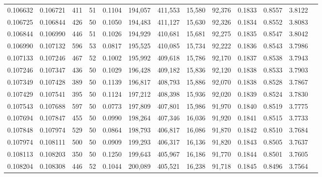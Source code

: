 \begin{tabular}{rrrrrrrrrrrrr}
0.106632 & 0.106721 &   411 &  51 &                                     0.1104 & 194,057 & 411,553 &  15,580 &  92,376 & 0.1833 & 0.8557 & 3.8122 \\
0.106725 & 0.106844 &   426 &  50 &                                     0.1050 & 194,483 & 411,127 &  15,630 &  92,326 & 0.1834 & 0.8552 & 3.8083 \\
0.106844 & 0.106990 &   446 &  51 &                                     0.1026 & 194,929 & 410,681 &  15,681 &  92,275 & 0.1835 & 0.8547 & 3.8042 \\
0.106990 & 0.107132 &   596 &  53 &                                     0.0817 & 195,525 & 410,085 &  15,734 &  92,222 & 0.1836 & 0.8543 & 3.7986 \\
0.107133 & 0.107246 &   467 &  52 &                                     0.1002 & 195,992 & 409,618 &  15,786 &  92,170 & 0.1837 & 0.8538 & 3.7943 \\
0.107246 & 0.107347 &   436 &  50 &                                     0.1029 & 196,428 & 409,182 &  15,836 &  92,120 & 0.1838 & 0.8533 & 3.7903 \\
0.107349 & 0.107428 &   389 &  50 &                                     0.1139 & 196,817 & 408,793 &  15,886 &  92,070 & 0.1838 & 0.8528 & 3.7867 \\
0.107429 & 0.107541 &   395 &  50 &                                     0.1124 & 197,212 & 408,398 &  15,936 &  92,020 & 0.1839 & 0.8524 & 3.7830 \\
0.107543 & 0.107688 &   597 &  50 &                                     0.0773 & 197,809 & 407,801 &  15,986 &  91,970 & 0.1840 & 0.8519 & 3.7775 \\
0.107694 & 0.107847 &   455 &  50 &                                     0.0990 & 198,264 & 407,346 &  16,036 &  91,920 & 0.1841 & 0.8515 & 3.7733 \\
0.107848 & 0.107974 &   529 &  50 &                                     0.0864 & 198,793 & 406,817 &  16,086 &  91,870 & 0.1842 & 0.8510 & 3.7684 \\
0.107974 & 0.108111 &   500 &  50 &                                     0.0909 & 199,293 & 406,317 &  16,136 &  91,820 & 0.1843 & 0.8505 & 3.7637 \\
0.108113 & 0.108203 &   350 &  50 &                                     0.1250 & 199,643 & 405,967 &  16,186 &  91,770 & 0.1844 & 0.8501 & 3.7605 \\
0.108204 & 0.108308 &   446 &  52 &                                     0.1044 & 200,089 & 405,521 &  16,238 &  91,718 & 0.1845 & 0.8496 & 3.7564 \\

\end{tabular}
